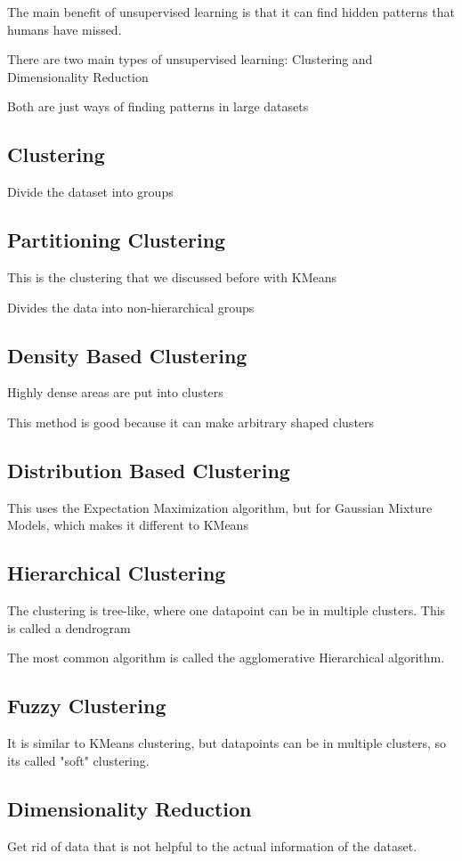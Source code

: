 \documentclass[fleqn]{report}
\begin{document}
The main benefit of unsupervised learning is that it can find hidden patterns 
that humans have missed.

There are two main types of unsupervised learning:
Clustering and Dimensionality Reduction 

Both are just ways of finding patterns in large datasets 

\subsection{Clustering}
Divide the dataset into groups 

\subsection{Partitioning Clustering}
This is the clustering that we discussed before with KMeans 

Divides the data into non-hierarchical groups 

\subsection{Density Based Clustering}
Highly dense areas are put into clusters 

This method is good because it can make arbitrary shaped clusters 

\subsection{Distribution Based Clustering}
This uses the Expectation Maximization algorithm, but for Gaussian Mixture Models, 
which makes it different to KMeans 

\subsection{Hierarchical Clustering}
The clustering is tree-like, where one datapoint can be in multiple clusters.
This is called a dendrogram

The most common algorithm is called the agglomerative Hierarchical algorithm. 

\subsection{Fuzzy Clustering}
It is similar to KMeans clustering, but datapoints can be in 
multiple clusters, so its called "soft" clustering. 

\subsection{Dimensionality Reduction}
Get rid of data that is not helpful to the actual information of the 
dataset. 
\end{document}
